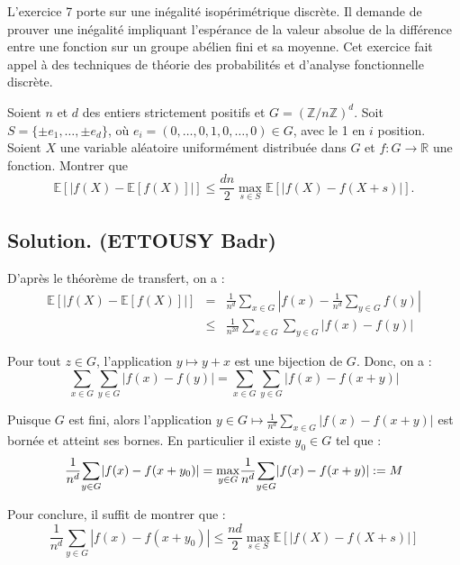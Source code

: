 L'exercice 7 porte sur une in{\'e}galit{\'e} isop{\'e}rim{\'e}trique
discr{\`e}te. Il demande de prouver une in{\'e}galit{\'e} impliquant
l'esp{\'e}rance de la valeur absolue de la diff{\'e}rence entre une fonction
sur un groupe ab{\'e}lien fini et sa moyenne. Cet exercice fait appel {\`a}
des techniques de th{\'e}orie des probabilit{\'e}s et d'analyse fonctionnelle
discr{\`e}te.
\begin{exercise}
Soient $n$ et $d$ des entiers strictement positifs et $G = (\mathbb{Z}/
n\mathbb{Z})^d$. Soit $S = \{ \pm e_1, \ldots, \pm e_d \}$, o{\`u} $e_i = (0,
\ldots, 0, 1, 0, \ldots, 0) \in G$, avec le 1 en $i$ position.
Soient $X$ une variable al{\'e}atoire uniform{\'e}ment distribu{\'e}e dans $G$
et $f : G \to \mathbb{R}$ une fonction. Montrer que
\[ \mathbb{E} [| f (X) -\mathbb{E}[f (X)] |] \leq \frac{dn}{2} \max_{s \in S}
   \mathbb{E} [|f (X) - f (X + s) |] . \]
\end{exercise}
\subsection*{Solution. (ETTOUSY Badr)}


D'apr{\`e}s le th{\'e}or{\`e}me de transfert, on a :
\begin{eqnarray*}
  \mathbb{E} [| f (X) -\mathbb{E}[f (X)] |] & = & \frac{1}{n^d} \underset{x
  \in G}{\sum} \left| f (x) - \frac{1}{n^d} \underset{y \in G}{\sum} f (y)
  \right|\\
  & \leqslant & \frac{1}{n^{2 d}} \underset{x \in G}{\sum} \underset{y \in
  G}{\sum} | f (x) - f (y) |
\end{eqnarray*}


Pour tout $z \in G$, l'application $y \longmapsto y + x$ est une bijection de
$G$. Donc, on a :
\[ \underset{x \in G}{\sum} \underset{y \in G}{\sum} | f (x) - f (y) | =
   \underset{x \in G}{\sum} \underset{y \in G}{\sum} | f (x) - f (x + y) | \]


Puisque $G$ est fini, alors l'application $y \in G \longmapsto \frac{1}{n^d}
\underset{x \in G}{\sum} | f (x) - f (x + y) |$ est born{\'e}e et atteint ses
bornes. En particulier il existe $y_0 \in G$ tel que :
\[ \frac{1}{n^d} \underset{y \in G}{\sum} | f (x) - f (x + y_0) | =
   \underset{y \in G}{\max} \frac{1}{n^d} \underset{y \in G}{\sum} | f (x) - f
   (x + y) | := M \]


Pour conclure, il suffit de montrer que :
\[ \frac{1}{n^d} \underset{y \in G}{\sum} | f (x) - f (x + y_0) | \leqslant
   \frac{n d}{2} \underset{s \in S}{\max}  \mathbb{E} [|f (X) - f (X + s) |]
\]


